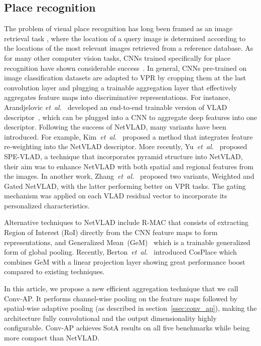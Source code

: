 \documentclass{article}
\newcommand{\etal}{\textit{et~al.}}
\begin{document}
\subsection{Place recognition}
The problem of visual place recognition has long been framed as an image retrieval task \cite{arandjelovic2016netvlad, kim2017learned, liu2019stochastic, seymour2019semantically, ge2020self}, where the location of a query image is determined according to the locations of the most relevant images retrieved from a reference database. As for many other computer vision tasks, CNNs trained specifically for place recognition have shown considerable success~\cite{chen2017deep, wang2018omnidirectional, yin2019multi, arandjelovic2016netvlad, ge2020self}. In general, CNNs pre-trained on image classification datasets are adapted to VPR by cropping them at the last convolution layer and plugging a trainable aggregation layer that effectively aggregates feature maps into discriminative representations. 
For instance, Arandjelovic \etal~\cite{arandjelovic2016netvlad} developed an end-to-end trainable version of VLAD descriptor~\cite{arandjelovic2013all}, which can be plugged into a CNN to aggregate deep features into one descriptor. Following the success of NetVLAD, many variants have been introduced. For example, Kim~\etal~\cite{kim2017learned} proposed a method that integrates feature re-weighting into the NetVLAD descriptor. More recently, Yu~\etal~\cite{yu2019spatial} proposed SPE-VLAD, a technique that incorporates pyramid structure into NetVLAD, their aim was to enhance NetVLAD with both spatial and regional features from the images. In another work, Zhang~\etal~\cite{zhang2021vector} proposed two variants, Weighted and Gated NetVLAD, with the latter performing better on VPR tasks. The gating mechanism was applied on each VLAD residual vector to incorporate its personalized characteristics.

Alternative techniques to NetVLAD include R-MAC \cite{tolias2015particular} that consists of extracting Region of Interest (RoI) directly from the CNN feature maps to form representations, and Generalized Mean~(GeM)~\cite{radenovic2018fine} which is a trainable generalized form of global pooling. Recently, Berton~\etal~\cite{berton2022rethinking} introduced CosPlace which combines GeM with a linear projection layer showing great performance boost compared to existing techniques.

In this article, we propose a new efficient aggregation technique that we call Conv-AP. It performs channel-wise pooling on the feature maps followed by spatial-wise adaptive pooling (as described in section~\ref{ssec:conv_ap}), making the architecture fully convolutional and the output dimensionality highly configurable. Conv-AP achieves SotA results on all five benchmarks while being~ more compact than NetVLAD.
\end{document}
